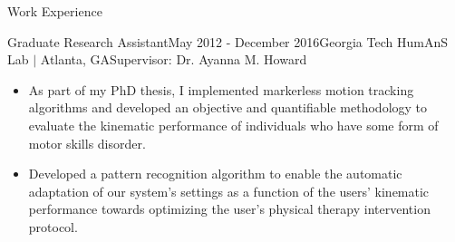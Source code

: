 \documentclass{resume} %
\begin{document}
\begin{rSection}{Work Experience}
\begin{rSubsection}{Graduate Research Assistant}{May 2012 - December 2016}{Georgia Tech HumAnS Lab $\vert$ Atlanta, GA}{Supervisor: Dr. Ayanna M. Howard}

\item
\begin{itemize}

\item As part of my PhD thesis, I implemented markerless motion tracking
  algorithms and developed an objective and quantifiable methodology to
  evaluate the kinematic performance of individuals who have some form of motor
  skills disorder.

\item Developed a pattern recognition algorithm to enable the automatic
  adaptation of our system's settings as a function of the users' kinematic
  performance towards optimizing the user's physical therapy intervention
  protocol.

\end{itemize}

\end{rSubsection}


\iffalse
\begin{rSubsection}{Graduate Research Assistant}{August 2011 - May 2012}{Georgia Tech MRL Lab $\vert$ Atlanta, GA}{Supervisor: Dr. Ronald C. Arkin}

\item
\begin{itemize}

\item Implemented the architecture and support for knowledge sharing across
  heterogeneous robotic agents as part of the MAST (Micro Autonomous Systems
  Technology) project.


\end{itemize}

\end{rSubsection}
\fi


\end{rSection}
\end{document}
